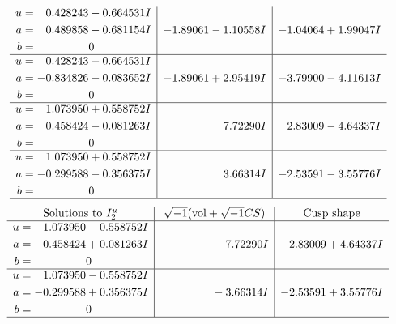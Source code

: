 \documentclass[1p]{elsarticle_modified}
\theoremstyle{definition}
\newcommand{\I}{\sqrt{-1}}
\begin{document}
$$\begin{array}{c|c|c}
\begin{aligned}
u &= \phantom{-}0.428243 - 0.664531 I \\
a &= \phantom{-}0.489858 - 0.681154 I \\
b &= \phantom{-0.000000 } 0\end{aligned}
 & -1.89061 - 1.10558 I & -1.04064 + 1.99047 I \\ \hline\begin{aligned}
u &= \phantom{-}0.428243 - 0.664531 I \\
a &= -0.834826 - 0.083652 I \\
b &= \phantom{-0.000000 } 0\end{aligned}
 & -1.89061 + 2.95419 I & -3.79900 - 4.11613 I \\ \hline\begin{aligned}
u &= \phantom{-}1.073950 + 0.558752 I \\
a &= \phantom{-}0.458424 - 0.081263 I \\
b &= \phantom{-0.000000 } 0\end{aligned}
 & \phantom{-0.000000 -}7.72290 I & \phantom{-}2.83009 - 4.64337 I \\ \hline\begin{aligned}
u &= \phantom{-}1.073950 + 0.558752 I \\
a &= -0.299588 - 0.356375 I \\
b &= \phantom{-0.000000 } 0\end{aligned}
 & \phantom{-0.000000 -}3.66314 I & -2.53591 - 3.55776 I\\
 \hline 
 \end{array}$$\newpage$$\begin{array}{c|c|c}  
\text{Solutions to }I^u_{2}& \I (\text{vol} + \sqrt{-1}CS) & \text{Cusp shape}\\
 \hline 
\begin{aligned}
u &= \phantom{-}1.073950 - 0.558752 I \\
a &= \phantom{-}0.458424 + 0.081263 I \\
b &= \phantom{-0.000000 } 0\end{aligned}
 & \phantom{-0.000000 } -7.72290 I & \phantom{-}2.83009 + 4.64337 I \\ \hline\begin{aligned}
u &= \phantom{-}1.073950 - 0.558752 I \\
a &= -0.299588 + 0.356375 I \\
b &= \phantom{-0.000000 } 0\end{aligned}
 & \phantom{-0.000000 } -3.66314 I & -2.53591 + 3.55776 I\\
 \hline 
 \end{array}$$\newpage
\end{document}
